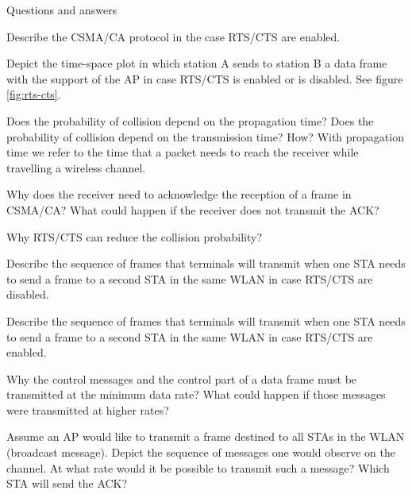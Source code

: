 \begin{section}{Questions and answers}
  \begin{subsubsection}{Describe the CSMA/CA protocol in the case RTS/CTS are enabled.}
  \end{subsubsection}
  \begin{subsubsection}{Depict the time-space plot in which station A sends to station B a data
    frame with the support of the AP in case RTS/CTS is enabled or is disabled.}
    See figure \ref{fig:rts-cts}.
  \end{subsubsection}
  \begin{subsubsection}{Does the probability of collision depend on the propagation time? Does the
    probability of collision depend on the transmission time? How?}
    With propagation time we refer to the time that a packet needs to reach the receiver while
    travelling a wireless channel.
  \end{subsubsection}
  \begin{subsubsection}{Why does the receiver need to acknowledge the reception of a frame in
    CSMA/CA? What could happen if the receiver does not transmit the ACK?}
  \end{subsubsection}
  \begin{subsubsection}{Why RTS/CTS can reduce the collision probability?}
  \end{subsubsection}
  \begin{subsubsection}{Describe the sequence of frames that terminals will transmit when one STA
    needs to send a frame to a second STA in the same WLAN in case RTS/CTS are disabled.}
  \end{subsubsection}
  \begin{subsubsection}{Describe the sequence of frames that terminals will transmit when one STA
    needs to send a frame to a second STA in the same WLAN in case RTS/CTS are enabled.}
  \end{subsubsection}
  \begin{subsubsection}{Why the control messages and the control part of a data frame must be
      transmitted at the minimum data rate? What could happen if those messages were transmitted at
    higher rates?}
  \end{subsubsection}
  \begin{subsubsection}{Assume an AP would like to transmit a frame destined to all STAs in the WLAN
      (broadcast message). Depict the sequence of messages one would observe on the channel. At what
    rate would it be possible to transmit such a message? Which STA will send the ACK?}
  \end{subsubsection}
\end{section}
